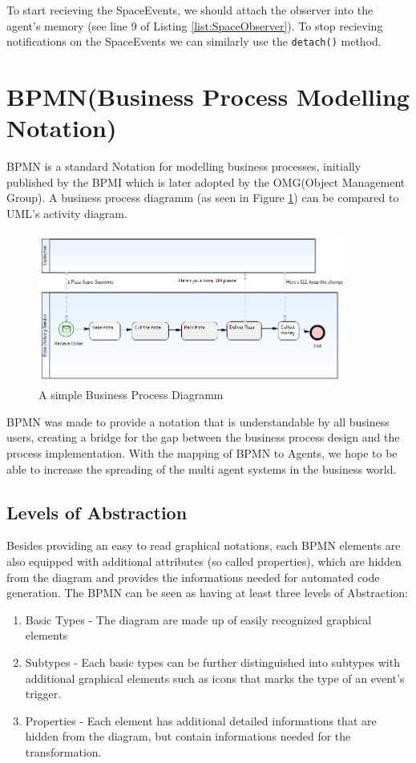To start recieving the SpaceEvents, we should attach the observer into the agent's memory (see line 9 of Listing \ref{list:SpaceObserver}). To stop recieving notifications on the SpaceEvents we can similarly use the \texttt{detach()} method.

\newpage
\section{BPMN(Business Process Modelling Notation)}
BPMN \cite{BPMN2} is a standard Notation for modelling business processes, initially published by the BPMI which is later adopted by the OMG(Object Management Group). A business process diagramm (as seen in Figure \ref{fig:bpmn_sampl}) can be compared to UML's activity diagram.\\
\begin{figure}[h]
	\centering
		\includegraphics[width=0.90\textwidth]{images/bpmn_sampl.png}
	\caption{A simple Business Process Diagramm}
	\label{fig:bpmn_sampl}
\end{figure}

BPMN was made to provide a notation that is understandable by all business users, creating a bridge for the gap between the business process design and the process implementation. With the mapping of BPMN to Agents, we hope to be able to increase the spreading of the multi agent systems in the business world.


\subsection{Levels of Abstraction}
Besides providing an easy to read graphical notations, each BPMN elements are also equipped with additional attributes (so called properties), which are hidden from the diagram and provides the informations needed for automated code generation. The BPMN can be seen as having at least three levels of Abstraction:
\begin{enumerate}
	\item Basic Types - The diagram are made up of easily recognized graphical elements
	\item Subtypes - Each basic types can be further distinguished into subtypes with additional graphical elements such as icons that marks the type of an event's trigger.
	\item Properties - Each element has additional detailed informations that are hidden from the diagram, but contain informations needed for the transformation.
\end{enumerate}


